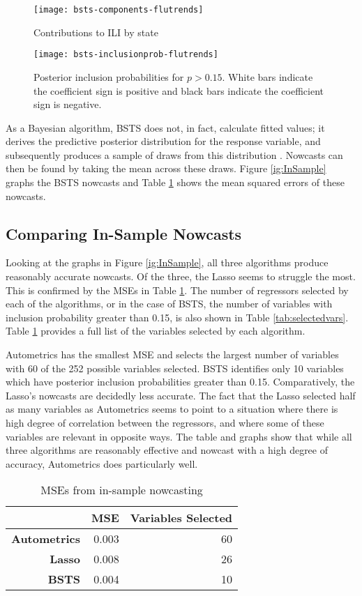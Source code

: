 \begin{figure}
\centering
\texttt{[image: bsts-components-flutrends]}
\caption{Contributions to ILI by state}
\label{fig:flutrendscomponents}
\end{figure}

\begin{figure}
\centering
\texttt{[image: bsts-inclusionprob-flutrends]}
\caption{Posterior inclusion probabilities for $p>0.15$. White bars indicate the coefficient sign is positive and black bars indicate the coefficient sign is negative.}
\label{fig:inclprob}
\end{figure}


As a Bayesian algorithm, BSTS does not, in fact, calculate fitted values; it derives the predictive posterior distribution for the response variable, and subsequently produces a sample of draws from this distribution \cite{bstspaper}. Nowcasts can then be found by taking the mean across these draws. Figure \ref{ig:InSample} graphs the BSTS nowcasts and Table \ref{tab:selvars} shows the mean squared errors of these nowcasts.
  
\subsection{Comparing In-Sample Nowcasts}

Looking at the graphs in Figure \ref{ig:InSample}, all three algorithms produce reasonably accurate nowcasts. Of the three, the Lasso seems to struggle the most. This is confirmed by the MSEs in Table \ref{tab:selvars}. The number of regressors selected by each of the algorithms, or in the case of BSTS, the number of variables with inclusion probability greater than 0.15, is also shown in Table \ref{tab:selectedvars}. Table \ref{tab:selvars} provides a full list of the variables selected by each algorithm.

Autometrics has the smallest MSE and selects the largest number of variables with 60 of the 252 possible variables selected. BSTS identifies only 10 variables which have posterior inclusion probabilities greater than 0.15. Comparatively, the Lasso's nowcasts are decidedly less accurate. The fact that the Lasso selected half as many variables as Autometrics seems to point to a situation where there is high degree of correlation between the regressors, and where some of these variables are relevant in opposite ways.
The table and graphs show that while all three algorithms are reasonably effective and nowcast with a high degree of accuracy, Autometrics does particularly well. 
\begin{table}
\centering
\begin{tabular}{r|r|r}
 & \textbf{MSE} & \textbf{Variables Selected}\\
 \hline
\textbf{Autometrics} & 0.003 & 60 \\
\textbf{Lasso} & 0.008 & 26\\
\textbf{BSTS} & 0.004 & 10\\
    \end{tabular}%
      \caption{MSEs from in-sample nowcasting}
  \label{tab:selvars}%
\end{table}%



